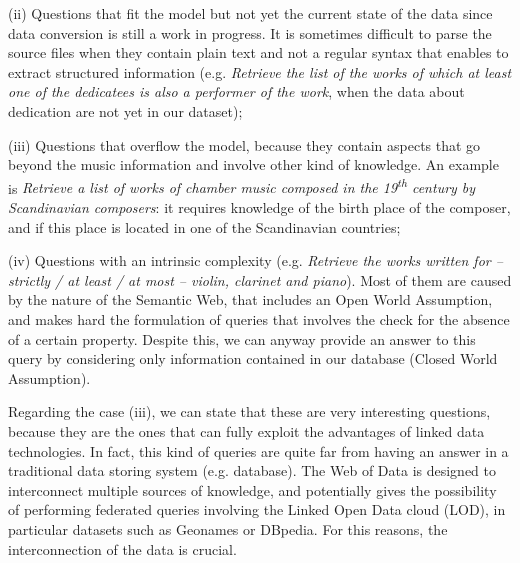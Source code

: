 (ii) Questions that fit the model but not yet the current state of the data since data conversion is still a work in progress. It is sometimes difficult to parse the source files when they contain plain text and not a regular syntax that enables to extract structured information (e.g. \textit{Retrieve the list of the works of which at least one of the dedicatees is also a performer of the work}, when the data about dedication are not yet in our dataset);

(iii) Questions that overflow the model, because they contain aspects that go beyond the music information and involve other kind of knowledge. An example is \textit{Retrieve a list of works of chamber music composed in the 19\textsuperscript{th} century by Scandinavian composers}: it requires knowledge of the birth place of the composer, and if this place is located in one of the Scandinavian countries;

(iv) Questions with an intrinsic complexity (e.g. \textit{Retrieve the works written for -- strictly / at least / at most -- violin, clarinet and piano}). Most of them are caused by the nature of the Semantic Web, that includes an Open World Assumption, and makes hard the formulation of queries that involves the check for the absence of a certain property. Despite this, we can anyway provide an answer to this query by considering only information contained in our database (Closed World Assumption).

Regarding the case (iii), we can state that these are very interesting questions, because they are the ones that can fully exploit the advantages of linked data technologies. In fact, this kind of queries are quite far from having an answer in a traditional data storing system (e.g. database). The Web of Data is designed to interconnect multiple sources of knowledge, and potentially gives the possibility of performing federated queries involving the Linked Open Data cloud (LOD), in particular datasets such as Geonames or DBpedia. For this reasons, the interconnection of the data is crucial. 

